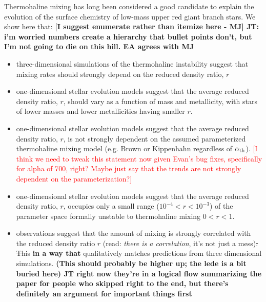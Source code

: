 %
%
%
Thermohaline mixing has long been considered a good candidate to explain the evolution of the surface chemistry of low-mass upper red giant branch stars. We show here that:
\textbf{[I suggest enumerate rather than itemize here - MJ] JT: i'm worried numbers create a hierarchy that bullet points don't, but I'm not going to die on this hill. EA agrees with MJ}
\begin{itemize}
    \item three-dimensional simulations of the thermohaline instability suggest that mixing rates should strongly depend on the reduced density ratio, $r$
    
    \item one-dimensional stellar evolution models suggest that the average reduced density ratio, $r$, should vary as a function of mass and metallicity, with stars of lower masses and lower metallicities having smaller $r$.
    
    \item one-dimensional stellar evolution models suggest that the average reduced density ratio, $r$, is not strongly dependent on the assumed parameterized thermohaline mixing model (e.g. Brown or Kippenhahn regardless of $\alpha_{\rm th}$). \textcolor{red}{[I think we need to tweak this statement now given Evan's bug fixes, specifically for alpha of 700, right? Maybe just say that the trends are not strongly dependent on the parameterization?]}
    
    \item one-dimensional stellar evolution models suggest that the average reduced density ratio, $r$, occupies only a small range ($10^{-4}<r<10^{-3}$) of the parameter space formally unstable to thermohaline mixing $0<r<1$.
    
    \item observations suggest that the amount of mixing is strongly correlated with the reduced density ratio $r$ (read: \emph{there is a correlation}, it's not just a mess)\sout{. This} \textbf{in a way that} qualitatively matches predictions from three dimensional simulations. {\bf (This should probably be higher up; the lede is a bit buried here) JT right now they're in a logical flow summarizing the paper for people who skipped right to the end, but there's definitely an argument for important things first}
    

\end{itemize}
